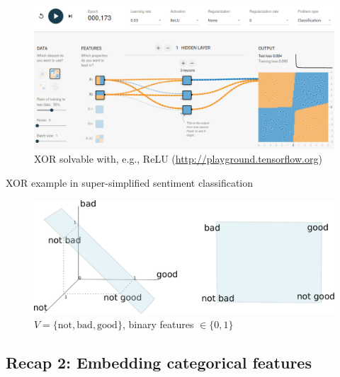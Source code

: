 \documentclass[12pt,aspectratio=169,handout]{beamer}
\begin{document}
\begin{frame}
	\begin{figure}
		\vspace{-1.3em}
		\includegraphics[width=1.35\linewidth]{img/linear4.png}	
		\caption{XOR solvable with, e.g., ReLU (\url{http://playground.tensorflow.org})}
	\end{figure}	
\end{frame}


\begin{frame}{XOR example in super-simplified sentiment classification}
	\begin{figure}
		\vspace{-1.3em}
		\includegraphics[width=1.2\linewidth]{img/xor1.pdf}	
		\caption{$V = \{\text{not}, \text{bad}, \text{good}\}$, binary features $\in \{0, 1\}$}
	\end{figure}	
\end{frame}


\subsection{Recap 2: Embedding categorical features}
\end{document}
